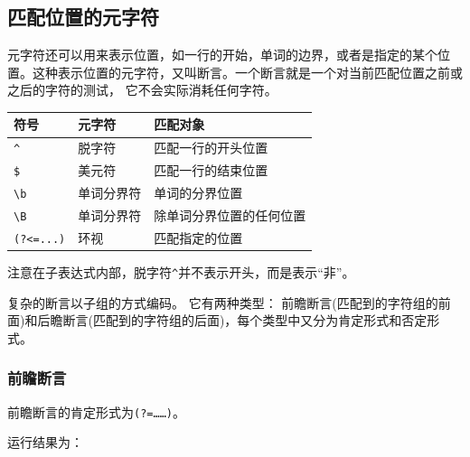 \documentclass[]{ctexbook}
\newenvironment{Shaded}{\begin{snugshade}}{\end{snugshade}}
\newcommand{\CommentTok}[1]{\textcolor[rgb]{0.56,0.35,0.01}{\textit{#1}}}
\newcommand{\FunctionTok}[1]{\textcolor[rgb]{0.00,0.00,0.00}{#1}}
\newcommand{\KeywordTok}[1]{\textcolor[rgb]{0.13,0.29,0.53}{\textbf{#1}}}
\newcommand{\NormalTok}[1]{#1}
\newcommand{\OtherTok}[1]{\textcolor[rgb]{0.56,0.35,0.01}{#1}}
\newcommand{\StringTok}[1]{\textcolor[rgb]{0.31,0.60,0.02}{#1}}
\begin{document}
\hypertarget{ux5339ux914dux4f4dux7f6eux7684ux5143ux5b57ux7b26}{%
\subsection{匹配位置的元字符}\label{ux5339ux914dux4f4dux7f6eux7684ux5143ux5b57ux7b26}}

元字符还可以用来表示位置，如一行的开始，单词的边界，或者是指定的某个位置。这种表示位置的元字符，又叫断言。一个断言就是一个对当前匹配位置之前或之后的字符的测试， 它不会实际消耗任何字符。

\begin{longtable}[]{@{}lll@{}}
\toprule
符号 & 元字符 & 匹配对象\tabularnewline
\midrule
\endhead
\texttt{\^{}} & 脱字符 & 匹配一行的开头位置\tabularnewline
\texttt{\$} & 美元符 & 匹配一行的结束位置\tabularnewline
\texttt{\textbackslash{}b} & 单词分界符 & 单词的分界位置\tabularnewline
\texttt{\textbackslash{}B} & 单词分界符 & 除单词分界位置的任何位置\tabularnewline
\texttt{(?\textless{}=...)} & 环视 & 匹配指定的位置\tabularnewline
\bottomrule
\end{longtable}

注意在子表达式内部，脱字符\texttt{\^{}}并不表示开头，而是表示``非''。

复杂的断言以子组的方式编码。 它有两种类型： 前瞻断言(匹配到的字符组的前面)和后瞻断言(匹配到的字符组的后面)，每个类型中又分为肯定形式和否定形式。

\hypertarget{ux524dux77bbux65adux8a00}{%
\subsubsection{前瞻断言}\label{ux524dux77bbux65adux8a00}}

前瞻断言的肯定形式为\texttt{(?=\ldots{}\ldots{})}。

\begin{Shaded}
\end{Shaded}

运行结果为：
\end{document}
